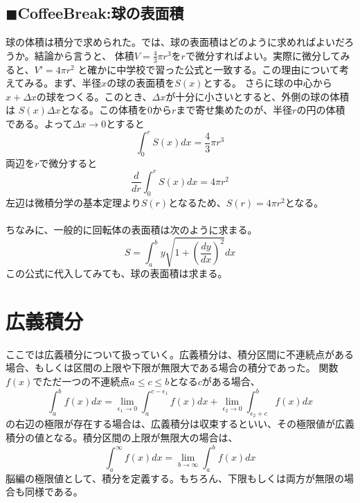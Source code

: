 \documentclass[a4j,dvipdfmx]{jsarticle}
\begin{document}
\subsection{$\blacksquare$CoffeeBreak:球の表面積}
\begin{screen}
    球の体積は積分で求められた。では、球の表面積はどのように求めればよいだろうか。結論から言うと、
    体積$\displaystyle V=\frac{4}{3}\pi r^3$を$r$で微分すればよい。実際に微分してみると、$V'=4\pi r^2$
    と確かに中学校で習った公式と一致する。この理由について考えてみる。まず、半径$x$の球の表面積を$S(x)$とする。
    さらに球の中心から$x+\Delta x$の球をつくる。このとき、$\Delta x$が十分に小さいとすると、外側の球の体積は
    $S(x)\Delta x$となる。この体積を$0$から$r$まで寄せ集めたのが、半径$r$の円の体積である。よって$\Delta x\to 0$とすると
    \begin{equation*}
        \int_0^r S(x)dx=\frac{4}{3}\pi r^3
    \end{equation*}
    両辺を$r$で微分すると
    \begin{equation*}
        \frac{d}{dr}\int_0^r S(x)dx=4\pi r^2
    \end{equation*}
    左辺は微積分学の基本定理より$S(r)$となるため、$S(r)=4\pi r^2$となる。\\\\

    ちなみに、一般的に回転体の表面積は次のように求まる。
    \begin{equation*}
        S=\int_a^b y\sqrt{1+\left(\frac{dy}{dx}\right)^2}dx
    \end{equation*}
    この公式に代入してみても、球の表面積は求まる。
\end{screen}
\newpage
\section{広義積分}
ここでは広義積分について扱っていく。広義積分は、積分区間に不連続点がある場合、もしくは区間の上限や下限が無限大である場合の積分であった。
関数$f(x)$でただ一つの不連続点$a\leq c\leq b$となる$c$がある場合、
\begin{equation*}
    \int_a^b f(x)dx=\lim_{\epsilon_1\to 0}\int_a^{c-\epsilon_1}f(x)dx+\lim_{\epsilon_2\to 0}\int_{\epsilon_2+c}^b f(x)dx
\end{equation*}
の右辺の極限が存在する場合は、広義積分は収束するといい、その極限値が広義積分の値となる。積分区間の上限が無限大の場合は、
\begin{equation*}
    \int_a^\infty f(x)dx=\lim_{b\to\infty}\int_a^b f(x)dx
\end{equation*}
脳編の極限値として、積分を定義する。もちろん、下限もしくは両方が無限の場合も同様である。
\end{document}
